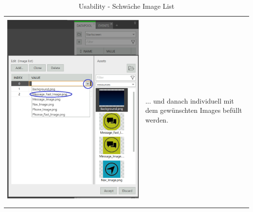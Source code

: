 \begin{longtable}[H] { c | m{5cm} }
	\\	
 \\ \hline
    \\
 \begin{minipage}{.4\textwidth}
      \includegraphics[width=\linewidth]{figures/ImageList_05.PNG}
    \end{minipage}
    &
  ... und danach individuell mit dem gewünschten Images befüllt werden.
	\\	
\\
  \caption{Usability - Schwäche Image List}\label{tab:gt}
\end{longtable}

